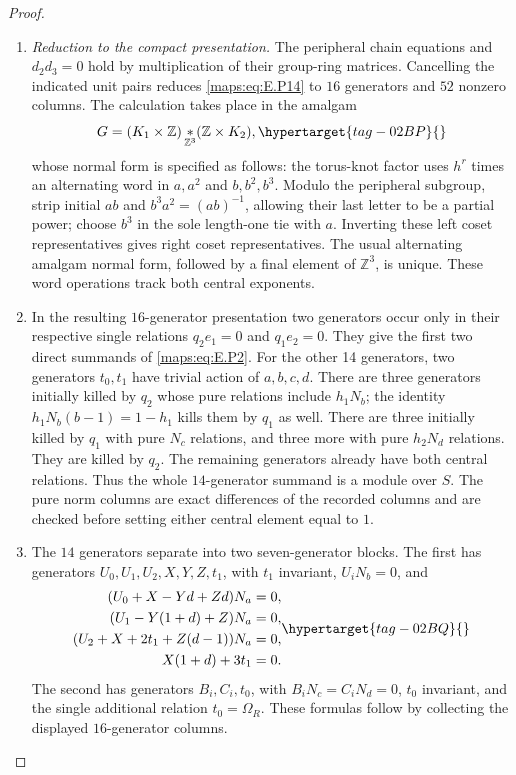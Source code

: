 \documentclass[11pt,a4paper]{article}
\numberwithin{equation}{section}
\theoremstyle{definition}
\begin{document}
\begin{proof}
\begin{enumerate}[label=\arabic*.,leftmargin=*]
\item \emph{Reduction to the compact presentation.}
The peripheral chain equations and $d_2d_3=0$ hold by multiplication
of their group-ring matrices. Cancelling the indicated unit pairs reduces
\eqref{maps:eq:E.P14} to $16$ generators and $52$ nonzero columns.
The calculation takes place in the amalgam
\begin{equation}
 G=(K_1\times\mathbb Z)\mathop{*}_{\mathbb Z^3}
                                      (\mathbb Z\times K_2),
 \hypertarget{tag-02BP}{}\label{maps:eq:E.P15}
\end{equation}
whose normal form is specified as follows: the torus-knot factor uses $h^r$ times an
alternating word in $a,a^2$ and $b,b^2,b^3$.
Modulo the peripheral subgroup, strip initial
$ab$ and $b^3a^2=(ab)^{-1}$, allowing their last
letter to be a partial power; choose $b^3$ in
the sole length-one tie with $a$. Inverting these
left coset representatives gives right coset
representatives. The usual alternating amalgam
normal form, followed by a final element of
$\mathbb Z^3$, is unique. These word operations track both central exponents.

\item In the resulting $16$-generator presentation two
generators occur only in their respective single
relations $q_2e_1=0$ and $q_1e_2=0$. They give the
first two direct summands of \eqref{maps:eq:E.P2}. For the other
14 generators, two generators $t_0,t_1$ have
trivial action of $a,b,c,d$. There are three
generators initially killed by $q_2$ whose pure
relations include $h_1N_b$; the identity
$h_1N_b(b-1)=1-h_1$ kills them by $q_1$ as well.
There are three initially killed by $q_1$ with
pure $N_c$ relations, and three more with pure
$h_2N_d$ relations. They are killed by $q_2$.
The remaining generators already have both
central relations. Thus the whole $14$-generator summand is a module over $S$. The pure norm columns
are exact differences of the recorded columns
and are checked before setting either central
element equal to $1$.

\item The $14$ generators separate into two seven-generator blocks. The
first has generators $U_0,U_1,U_2,X,Y,Z,t_1$,
with $t_1$ invariant, $U_iN_b=0$, and
\begin{equation}
 \begin{split}
 (U_0+X-Yd+Zd)N_a&=0,\\
 (U_1-Y(1+d)+Z)N_a&=0,\\
 (U_2+X+2t_1+Z(d-1))N_a&=0,\\
 X(1+d)+3t_1&=0.
 \end{split}
 \hypertarget{tag-02BQ}{}\label{maps:eq:E.P16}
\end{equation}
The second has generators $B_i,C_i,t_0$, with
$B_iN_c=C_iN_d=0$, $t_0$ invariant, and the single
additional relation $t_0=\Omega_R$. These formulas
follow by collecting the displayed $16$-generator
columns.


\end{enumerate}
\end{proof}
\end{document}
